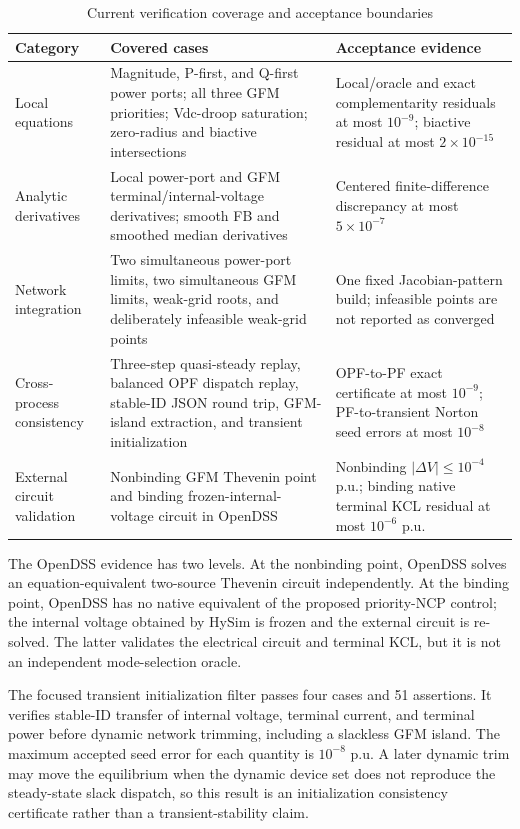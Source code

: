 \begin{table}[t]
\caption{Current verification coverage and acceptance boundaries}
\label{tab:verification}
\centering\footnotesize
\setlength{\tabcolsep}{4pt}
\begin{tabular}{p{}p{}p{}}
\toprule
Category & Covered cases & Acceptance evidence\\
\midrule
Local equations
& Magnitude, P-first, and Q-first power ports; all three GFM priorities;
Vdc-droop saturation; zero-radius and biactive intersections
& Local/oracle and exact complementarity residuals at most $10^{-9}$;
biactive residual at most $2\times10^{-15}$\\
Analytic derivatives
& Local power-port and GFM terminal/internal-voltage derivatives; smooth FB and
smoothed median derivatives
& Centered finite-difference discrepancy at most $5\times10^{-7}$\\
Network integration
& Two simultaneous power-port limits, two simultaneous GFM limits, weak-grid
roots, and deliberately infeasible weak-grid points
& One fixed Jacobian-pattern build; infeasible points are not reported as
converged\\
Cross-process consistency
& Three-step quasi-steady replay, balanced OPF dispatch replay, stable-ID JSON
round trip, GFM-island extraction, and transient initialization
& OPF-to-PF exact certificate at most $10^{-9}$; PF-to-transient Norton seed
errors at most $10^{-8}$\\
External circuit validation
& Nonbinding GFM Thevenin point and binding frozen-internal-voltage circuit in
OpenDSS
& Nonbinding $|\Delta V|\le10^{-4}$ p.u.; binding native terminal KCL residual
at most $10^{-6}$ p.u.\\
\bottomrule
\end{tabular}
\end{table}

The OpenDSS evidence has two levels. At the nonbinding point, OpenDSS solves an
equation-equivalent two-source Thevenin circuit independently. At the binding
point, OpenDSS has no native equivalent of the proposed priority-NCP control;
the internal voltage obtained by HySim is frozen and the external circuit is
re-solved. The latter validates the electrical circuit and terminal KCL, but it
is not an independent mode-selection oracle.

The focused transient initialization filter passes four cases and 51
assertions. It verifies stable-ID transfer of internal voltage, terminal
current, and terminal power before dynamic network trimming, including a
slackless GFM island. The maximum accepted seed error for each quantity is
$10^{-8}$ p.u. A later dynamic trim may move the equilibrium when the dynamic
device set does not reproduce the steady-state slack dispatch, so this result
is an initialization consistency certificate rather than a transient-stability
claim.

